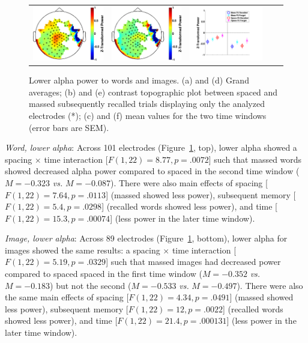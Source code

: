 \begin{figure}[H]
\begin{tabular}{ccccc}
  \includegraphics[width=.19\textwidth]{./figs/exp1/tfr_topocont_ga_img_RgH_rc_spac_p2vsimg_RgH_rc_mass_p2_89ROIs_8_10_0_500_-1p0_1p0_cb} &
  \includegraphics[width=.19\textwidth]{./figs/exp1/tfr_topocont_ga_img_RgH_rc_spac_p2vsimg_RgH_rc_mass_p2_89ROIs_8_10_520_1000_-1p0_1p0_cb} &
  \includegraphics[width=.30\textwidth]{./figs/exp1/tfr_avg_ga_img_RgH_rc_mass_p2_img_RgH_fo_mass_p2_img_RgH_rc_spac_p2_img_RgH_fo_spac_p2_89ROI_0_500_500_1000_8_10_ylabel} \\
  \end{tabular}
  \caption{Lower alpha power to words and images.  (a) and (d) Grand averages; (b) and (e) contrast topographic plot between spaced and massed subsequently recalled trials displaying only the analyzed electrodes (*); (c) and (f) mean values for the two time windows (error bars are SEM).}
  \label{fig:word_img_alpha_low}
\end{figure}

\textit{Word, lower alpha}: Across 101 electrodes (Figure~\ref{fig:word_img_alpha_low}, top), lower alpha showed a spacing $\times$ time interaction [$F(1,22)=8.77, p=.0072$] such that massed words showed decreased alpha power compared to spaced in the second time window ($M=-0.323$ \textit{vs.} $M=-0.087$).
There were also main effects of spacing [$F(1,22)=7.64, p=.0113$] (massed showed less power), subsequent memory [$F(1,22)=5.4, p=.0298$] (recalled words showed less power), and time [$F(1,22)=15.3, p=.00074$] (less power in the later time window).

\textit{Image, lower alpha}: Across 89 electrodes (Figure~\ref{fig:word_img_alpha_low}, bottom), lower alpha for images showed the same results: a spacing $\times$ time interaction [$F(1,22)=5.19, p=.0329$] such that massed images had decreased power compared to spaced spaced in the first time window ($M=-0.352$ \textit{vs.} $M=-0.183$) but not the second ($M=-0.533$ \textit{vs.} $M=-0.497$).
There were also the same main effects of spacing [$F(1,22)=4.34, p=.0491$] (massed showed less power), subsequent memory [$F(1,22)=12, p=.0022$] (recalled words showed less power), and time [$F(1,22)=21.4, p=.000131$] (less power in the later time window).


